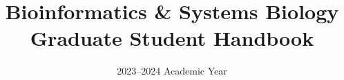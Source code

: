 \documentclass[12pt,titlepage]{book}
\title{\textbf{Bioinformatics \& Systems Biology}\\Graduate Student Handbook}
\date{2023--2024 Academic Year}
\begin{document}
\maketitle
\begingroup\let\cleardoublepage\clearpage\tableofcontents\endgroup



\end{document}
